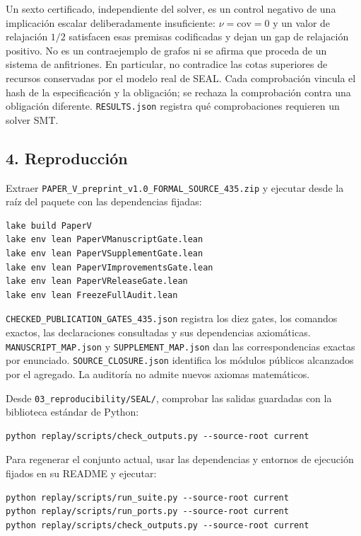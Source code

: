 \documentclass[spanish,11pt,a4paper]{article}
\begin{document}
Un sexto certificado, independiente del solver, es un control negativo
de una implicación escalar deliberadamente insuficiente:
\(\nu=\mathrm{cov}=0\) y un valor de relajación \(1/2\) satisfacen esas
premisas codificadas y dejan un gap de relajación positivo. No es un
contraejemplo de grafos ni se afirma que proceda de un sistema de
anfitriones. En particular, no contradice las cotas superiores de
recursos conservadas por el modelo real de SEAL. Cada comprobación
vincula el hash de la especificación y la obligación; se rechaza la
comprobación contra una obligación diferente. \texttt{RESULTS.json}
registra qué comprobaciones requieren un solver SMT.

\subsection{4. Reproducción}\label{reproducciuxf3n}

Extraer \nolinkurl{PAPER_V_preprint_v1.0_FORMAL_SOURCE_435.zip} y
ejecutar desde la raíz del paquete con las dependencias fijadas:

\begin{verbatim}
lake build PaperV
lake env lean PaperVManuscriptGate.lean
lake env lean PaperVSupplementGate.lean
lake env lean PaperVImprovementsGate.lean
lake env lean PaperVReleaseGate.lean
lake env lean FreezeFullAudit.lean
\end{verbatim}

\nolinkurl{CHECKED_PUBLICATION_GATES_435.json} registra los diez gates,
los comandos exactos, las declaraciones consultadas y sus dependencias
axiomáticas. \nolinkurl{MANUSCRIPT_MAP.json} y
\nolinkurl{SUPPLEMENT_MAP.json} dan las correspondencias exactas por
enunciado. \nolinkurl{SOURCE_CLOSURE.json} identifica los módulos públicos
alcanzados por el agregado. La auditoría no admite nuevos axiomas
matemáticos.

Desde \nolinkurl{03_reproducibility/SEAL/}, comprobar las salidas
guardadas con la biblioteca estándar de Python:

\begin{verbatim}
python replay/scripts/check_outputs.py --source-root current
\end{verbatim}

Para regenerar el conjunto actual, usar las dependencias y entornos de
ejecución fijados en su README y ejecutar:

\begin{verbatim}
python replay/scripts/run_suite.py --source-root current
python replay/scripts/run_ports.py --source-root current
python replay/scripts/check_outputs.py --source-root current
\end{verbatim}
\end{document}
